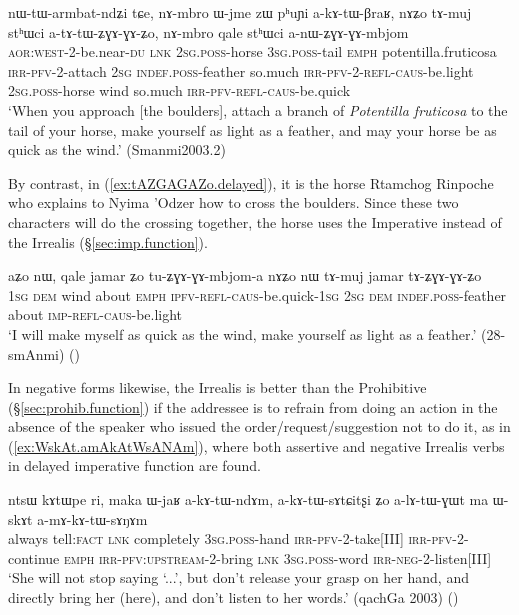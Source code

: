 \begin{exe}
\ex \label{ex:atAtWZGAGAZo.delayed}
\gll nɯ-tɯ-armbat-ndʑi tɕe, nɤ-mbro ɯ-jme zɯ pʰuɲi a-kɤ-tɯ-βraʁ, nɤʑo tɤ-muj stʰɯci a-tɤ-tɯ-ʑɣɤ-ɣɤ-ʑo, nɤ-mbro qale stʰɯci a-nɯ-ʑɣɤ-ɣɤ-mbjom \\
\textsc{aor}:\textsc{west}-2-be.near-\textsc{du} \textsc{lnk} \textsc{2sg}.\textsc{poss}-horse \textsc{3sg}.\textsc{poss}-tail \textsc{emph} potentilla.fruticosa \textsc{irr}-\textsc{pfv}-2-attach \textsc{2sg} \textsc{indef}.\textsc{poss}-feather so.much \textsc{irr}-\textsc{pfv}-2-\textsc{refl}-\textsc{caus}-be.light \textsc{2sg}.\textsc{poss}-horse wind so.much \textsc{irr}-\textsc{pfv}-\textsc{refl}-\textsc{caus}-be.quick \\
\glt `When you approach [the boulders], attach a branch of \textit{Potentilla fruticosa} to the tail of your horse, make yourself as light as a feather, and may your horse be as quick as the wind.' (Smanmi2003.2)
\end{exe}

By contrast, in (\ref{ex:tAZGAGAZo.delayed}), it is the horse Rtamchog Rinpoche who explains to Nyima 'Odzer how to cross the boulders. Since these two characters will do the crossing together, the horse uses the Imperative  instead of the Irrealis (§\ref{sec:imp.function}).

\begin{exe}
\ex \label{ex:tAZGAGAZo.delayed}
\gll aʑo nɯ, qale jamar ʑo tu-ʑɣɤ-ɣɤ-mbjom-a nɤʑo nɯ tɤ-muj jamar tɤ-ʑɣɤ-ɣɤ-ʑo \\
\textsc{1sg} \textsc{dem} wind about \textsc{emph} \textsc{ipfv}-\textsc{refl}-\textsc{caus}-be.quick-\textsc{1sg} \textsc{2sg} \textsc{dem} \textsc{indef}.\textsc{poss}-feather about \textsc{imp}-\textsc{refl}-\textsc{caus}-be.light \\
\glt `I will make myself as quick as the wind, make yourself as light as a feather.' (28-smAnmi) ()
\end{exe}
 
In negative forms likewise, the Irrealis is better than the Prohibitive (§\ref{sec:prohib.function}) if the addressee is to refrain from doing an action in the absence of the speaker who issued the order/request/suggestion not to do it, as in (\ref{ex:WskAt.amAkAtWsANAm}), where both assertive and negative Irrealis verbs in delayed imperative function are found.


\begin{exe}
\ex \label{ex:WskAt.amAkAtWsANAm}
\gll  [...] ntsɯ kɤtɯpe ri, maka ɯ-jaʁ a-kɤ-tɯ-ndɤm, a-kɤ-tɯ-sɤtɕitʂi ʑo a-lɤ-tɯ-ɣɯt ma ɯ-skɤt a-mɤ-kɤ-tɯ-sɤŋɤm \\
{ } always tell:\textsc{fact} \textsc{lnk} completely \textsc{3sg}.\textsc{poss}-hand \textsc{irr}-\textsc{pfv}-2-take[III] \textsc{irr}-\textsc{pfv}-2-continue \textsc{emph} \textsc{irr}-\textsc{pfv}:\textsc{upstream}-2-bring \textsc{lnk} \textsc{3sg}.\textsc{poss}-word \textsc{irr}-\textsc{neg}-2-listen[III] \\
\glt `She will not stop saying `...', but don't release your grasp on her hand, and directly bring her (here), and don't listen to her words.' (qachGa 2003)
()
\end{exe}

